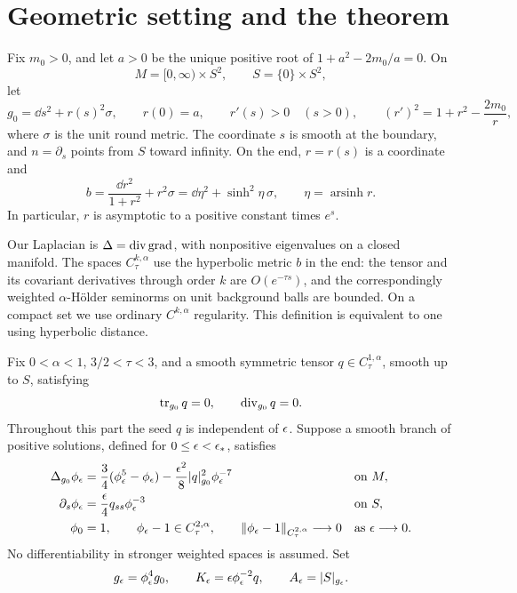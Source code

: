 \section{Geometric setting and the theorem}\label{ads:sec:setting}

Fix $m_0>0$, and let $a>0$ be the unique positive root of
$1+a^2-2m_0/a=0$. On
\[
 M=[0,\infty)\times S^2,\qquad S=\{0\}\times S^2,
\]
let
\begin{equation}\label{ads:eq:background}
 g_0=\dd s^2+r(s)^2\sigma,\qquad
 r(0)=a,\qquad r'(s)>0\quad(s>0),\qquad
 (r')^2=1+r^2-\frac{2m_0}{r},
\end{equation}
where $\sigma$ is the unit round metric. The coordinate $s$ is smooth
at the boundary, and $n=\partial_s$ points from $S$ toward infinity.
On the end, $r=r(s)$ is a coordinate and
\begin{equation}\label{ads:eq:hyperbolic-reference}
 b=\frac{\dd r^2}{1+r^2}+r^2\sigma
   =\dd\eta^2+\sinh^2\eta\,\sigma,\qquad
 \eta=\operatorname{arsinh}r.
\end{equation}
In particular, $r$ is asymptotic to a positive constant times $e^s$.

Our Laplacian is $\Delta=\operatorname{div}\operatorname{grad}$, with nonpositive eigenvalues
on a closed manifold. The spaces $C^{k,\alpha}_\tau$ use the
hyperbolic metric $b$ in the end: the tensor and its covariant
derivatives through order $k$ are $O(e^{-\tau s})$, and the
correspondingly weighted $\alpha$-H\"older seminorms on unit
background balls are bounded. On a compact set we use ordinary
$C^{k,\alpha}$ regularity. This definition is equivalent to one
using hyperbolic distance.

Fix $0<\alpha<1$, $3/2<\tau<3$, and a smooth symmetric tensor
$q\in C^{1,\alpha}_\tau$, smooth up to $S$, satisfying
\begin{equation}\label{ads:eq:tt-seed}
 \operatorname{tr}_{g_0}q=0,\qquad \operatorname{div}_{g_0}q=0.
\end{equation}
Throughout this part the seed $q$ is independent of $\epsilon$.
Suppose a smooth branch of positive solutions, defined for
$0\leq\epsilon<\epsilon_*$, satisfies
\begin{align}
 \Delta_{g_0}\phi_\epsilon
 &=\frac34(\phi_\epsilon^5-\phi_\epsilon)
   -\frac{\epsilon^2}{8}|q|_{g_0}^2\phi_\epsilon^{-7}
       &&\text{on }M,\label{ads:eq:conformal-equation}\\
 \partial_s\phi_\epsilon
 &=\frac{\epsilon}{4}q_{ss}\phi_\epsilon^{-3}
       &&\text{on }S,\label{ads:eq:conformal-boundary}\\
 \phi_0&=1,\qquad
 \phi_\epsilon-1\in C^{2,\alpha}_\tau,\qquad
 \|\phi_\epsilon-1\|_{C^{2,\alpha}_\tau}\longrightarrow0
       &&\text{as }\epsilon\longrightarrow0.\label{ads:eq:branch}
\end{align}
No differentiability in stronger weighted spaces is assumed.
Set
\begin{equation}\label{ads:eq:actual-data}
 g_\epsilon=\phi_\epsilon^4g_0,\qquad
 K_\epsilon=\epsilon\phi_\epsilon^{-2}q,\qquad
 A_\epsilon=|S|_{g_\epsilon}.
\end{equation}

